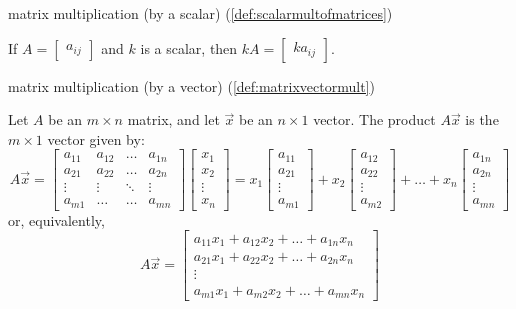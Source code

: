 \documentclass{ximera}
\begin{document}
matrix multiplication (by a scalar) (\ref{def:scalarmultofmatrices})
\begin{expandable}{}{}
    If $A=\begin{bmatrix} a_{ij}\end{bmatrix} $ and $k$ is a scalar,
then $kA=\begin{bmatrix} ka_{ij}\end{bmatrix}$. 
\end{expandable}

matrix multiplication (by a vector) (\ref{def:matrixvectormult})
\begin{expandable}{}{}
    Let $A$ be an $m\times n$ matrix, and let $\vec{x}$ be an $n\times 1$ vector.  The product $A\vec{x}$ is the $m\times 1$ vector given by:
$$A\vec{x}=\begin{bmatrix}
           a_{11} & a_{12}&\dots&a_{1n}\\
           a_{21}&a_{22} &\dots &a_{2n}\\
		\vdots & \vdots&\ddots &\vdots\\
		a_{m1}&\dots &\dots &a_{mn}
         \end{bmatrix}\begin{bmatrix}x_1\\x_2\\\vdots\\x_n\end{bmatrix}=
         x_1\begin{bmatrix}a_{11}\\a_{21}\\ \vdots \\a_{m1}\end{bmatrix}+
         x_2\begin{bmatrix}a_{12}\\a_{22}\\ \vdots \\a_{m2}\end{bmatrix}+\dots+
         x_n\begin{bmatrix}a_{1n}\\a_{2n}\\ \vdots \\a_{mn}\end{bmatrix}$$
or, equivalently,
$$A\vec{x}=\begin{bmatrix}a_{11}x_1+a_{12}x_2+\ldots +a_{1n}x_n\\a_{21}x_1+a_{22}x_2+\ldots +a_{2n}x_n\\\vdots\\a_{m1}x_1+a_{m2}x_2+\ldots +a_{mn}x_n\end{bmatrix}$$
\end{expandable}
\end{document}
